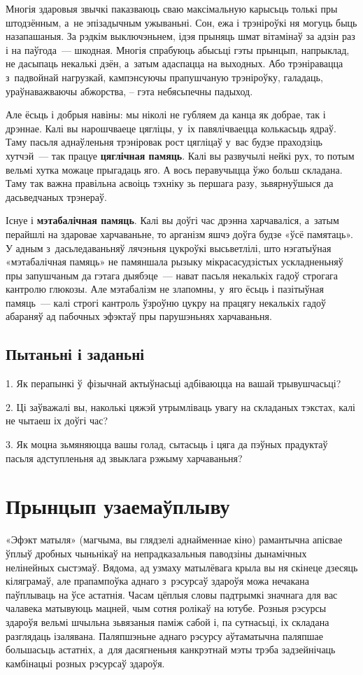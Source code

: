 Многія здаровыя звычкі паказваюць сваю максімальную карысьць толькі пры штодзённым, а~не эпізадычным ужываньні. Сон, ежа і трэніроўкі ня могуць быць назапашаныя. За рэдкім выключэньнем, ідэя прыняць шмат вітамінаў за адзін раз і на паўгода~--- шкодная. Многія спрабуюць абысьці гэты прынцып, напрыклад, не дасыпаць некалькі дзён, а~затым адаспацца на выходных. Або трэніравацца з~падвойнай нагрузкай, кампэнсуючы прапушчаную трэніроўку, галадаць, ураўнаважваючы абжорства, -- гэта небясьпечны падыход.

Але ёсьць і добрыя навіны: мы ніколі не губляем да канца як добрае, так і дрэннае. Калі вы нарошчваеце цягліцы, у~іх павялічваецца колькасьць ядраў. Таму пасьля аднаўленьня трэніровак рост цягліцаў у~вас будзе праходзіць хутчэй~--- так працуе \textbf{цяглічная памяць}. Калі вы развучылі нейкі рух, то потым вельмі хутка можаце прыгадаць яго. А вось перавучыцца ўжо больш складана. Таму так важна правільна асвоіць тэхніку зь першага разу, зьвярнуўшыся да дасьведчаных трэнераў.

Існуе і \textbf{мэтабалічная памяць}. Калі вы доўгі час дрэнна харчаваліся, а~затым перайшлі на здаровае харчаваньне, то арганізм яшчэ доўга будзе «ўсё памятаць». У адным з~дасьледаваньняў лячэньня цукроўкі высьветлілі, што нэгатыўная «мэтабалічная памяць» не памяншала рызыку мікрасасудзістых ускладненьняў пры запушчаным да гэтага дыябэце~--- нават пасьля некалькіх гадоў строгага кантролю глюкозы. Але мэтабалізм не злапомны, у~яго ёсьць і пазітыўная памяць~--- калі строгі кантроль ўзроўню цукру на працягу некалькіх гадоў абараняў ад пабочных эфэктаў пры парушэньнях харчаваньня.

\subsection*{Пытаньні і заданьні}

1. Як перапынкі ў~фізычнай актыўнасьці адбіваюцца на вашай трывушчасьці?

2. Ці заўважалі вы, наколькі цяжэй утрымліваць увагу на складаных тэкстах, калі не чытаеш іх доўгі час?

3. Як моцна зьмяняюцца вашы голад, сытасьць і цяга да пэўных прадуктаў пасьля адступленьня ад звыклага рэжыму харчаваньня?


\section{Прынцып узаемаўплыву}

«Эфэкт матыля» (магчыма, вы глядзелі аднайменнае кіно) рамантычна апісвае ўплыў дробных чыньнікаў на непрадказальныя паводзіны дынамічных нелінейных сыстэмаў. Вядома, ад узмаху матылёвага крыла вы ня скінеце дзесяць кіляграмаў, але прапампоўка аднаго з~рэсурсаў здароўя можа нечакана паўплываць на ўсе астатнія. Часам цёплыя словы падтрымкі значнага для вас чалавека матывуюць мацней, чым сотня ролікаў на ютубе. Розныя рэсурсы здароўя вельмі шчыльна зьвязаныя паміж сабой і, па сутнасьці, іх складана разглядаць ізалявана. Паляпшэньне аднаго рэсурсу аўтаматычна паляпшае большасьць астатніх, а~для дасягненьня канкрэтнай мэты трэба задзейнічаць камбінацыі розных рэсурсаў здароўя.

